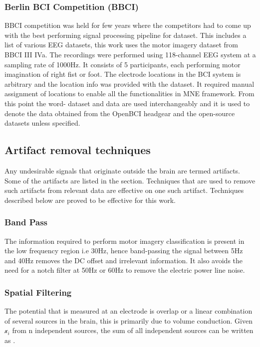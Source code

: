 \subsubsection{Berlin BCI Competition (BBCI)}
BBCI \cite{2004_BBCI} competition was held for few years where the competitors had to come up with the best performing signal processing pipeline for dataset. This includes a list of various EEG datasets, this work uses the motor imagery dataset from BBCI III IVa. The recordings were performed using 118-channel EEG system at a sampling rate of 1000Hz. It consists of 5 participants, each performing motor imagination of right fist or foot. The electrode locations in the BCI system is arbitrary and the location info was provided with the dataset. It required manual assignment of locations to enable all the functionalities in MNE framework. From this point the word- dataset and data are used interchangeably and it is used to denote the data obtained from the OpenBCI headgear and the open-source datasets unless specified.

\subsection{Artifact removal techniques}
Any undesirable signals that originate outside the brain are termed artifacts. Some of the artifacts are listed in the section. Techniques that are used to remove such artifacts from relevant data are effective on one such artifact. Techniques described below are proved to be effective for this work. 

\subsubsection{Band Pass}
The information required to perform motor imagery classification is present in the low frequency region i.e 30Hz, hence band-passing the signal between 5Hz and 40Hz removes the DC offset and irrelevant information. It also avoids the need for a notch filter at 50Hz or 60Hz to remove the electric power line noise. 

\subsubsection{Spatial Filtering}
The potential that is measured at an electrode is overlap or a linear combination of several sources in the brain, this is primarily due to volume conduction. Given $\mathcal{x}_i$ from n independent sources, the sum of all independent sources can be written as .


